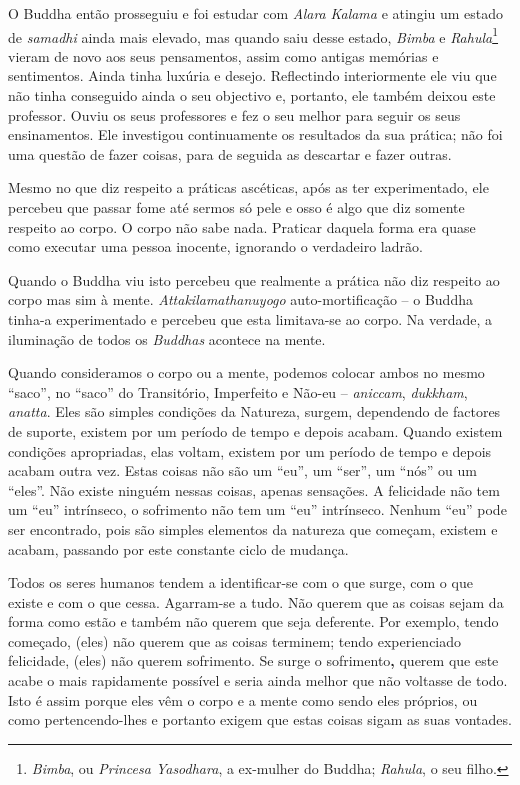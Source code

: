 O Buddha então prosseguiu e foi estudar com \emph{Alara} \emph{Kalama} e
atingiu um estado de \emph{samadhi} ainda mais elevado, mas quando saiu
desse estado, \emph{Bimba} e \emph{Rahula}\footnote{%
  \emph{Bimba}, ou \emph{Princesa Yasodhara}, a ex-mulher do
  Buddha; \emph{Rahula}, o seu filho.
}
vieram de novo aos seus
pensamentos, assim como antigas memórias e sentimentos. Ainda tinha
luxúria e desejo. Reflectindo interiormente ele viu que não tinha
conseguido ainda o seu objectivo e, portanto, ele também deixou este
professor. Ouviu os seus professores e fez o seu melhor para seguir os
seus ensinamentos. Ele investigou continuamente os resultados da sua
prática; não foi uma questão de fazer coisas, para de seguida as
descartar e fazer outras.

Mesmo no que diz respeito a práticas ascéticas, após as ter
experimentado, ele percebeu que passar fome até sermos só pele e osso é
algo que diz somente respeito ao corpo. O corpo não sabe nada. Praticar
daquela forma era quase como executar uma pessoa inocente, ignorando o
verdadeiro ladrão.

Quando o Buddha viu isto percebeu que realmente a prática não diz
respeito ao corpo mas sim à mente. \emph{Attakilamathanuyogo}
auto-mortificação -- o Buddha tinha-a experimentado e percebeu que esta
limitava-se ao corpo. Na verdade, a iluminação de todos os
\emph{Buddhas} acontece na mente.

Quando consideramos o corpo ou a mente, podemos colocar ambos no mesmo
``saco'', no ``saco'' do Transitório, Imperfeito e Não-eu --
\emph{aniccam}, \emph{dukkham}, \emph{anatta}. Eles são simples
condições da Natureza, surgem, dependendo de factores de suporte,
existem por um período de tempo e depois acabam. Quando existem
condições apropriadas, elas voltam, existem por um período de tempo e
depois acabam outra vez. Estas coisas não são um ``eu'', um ``ser'', um
``nós'' ou um ``eles''. Não existe ninguém nessas coisas, apenas
sensações. A felicidade não tem um ``eu'' intrínseco, o sofrimento não
tem um ``eu'' intrínseco. Nenhum ``eu'' pode ser encontrado, pois são
simples elementos da natureza que começam, existem e acabam, passando
por este constante ciclo de mudança.

Todos os seres humanos tendem a identificar-se com o que surge, com o
que existe e com o que cessa. Agarram-se a tudo. Não querem que as
coisas sejam da forma como estão e também não querem que seja deferente.
Por exemplo, tendo começado, (eles) não querem que as coisas terminem;
tendo experienciado felicidade, (eles) não querem sofrimento. Se surge o
sofrimento\textbf{,} querem que este acabe o mais rapidamente possível e
seria ainda melhor que não voltasse de todo. Isto é assim porque eles
vêm o corpo e a mente como sendo eles próprios, ou como pertencendo-lhes
e portanto exigem que estas coisas sigam as suas vontades.


